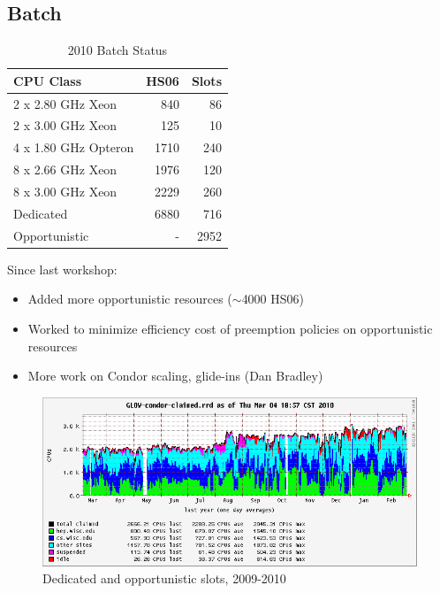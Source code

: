 \documentclass{beamer}
\newcommand{\ca}{\ensuremath{\sim}}
\begin{document}
\subsection{Batch}
\begin{frame}
\begin{table}
\begin{tabular}{lrr}
	\toprule
	CPU Class							&	 HS06		&	Slots \\
	\midrule
	2 x 2.80 GHz Xeon			&	 840		&	 86 \\	%
	2 x 3.00 GHz Xeon			&	 125		&	 10 \\	%
	4 x 1.80 GHz Opteron	&	 1710	 	&	 240 \\	%
	8 x 2.66 GHz Xeon			&	 1976	 	&	 120 \\	%
	8 x 3.00 GHz Xeon			&	 2229		&	 260 \\	%
	\midrule
	Dedicated							&	 6880		&	 716 \\
	Opportunistic					&	 -			&	 2952 \\
	\bottomrule
\end{tabular}
\caption{2010 Batch Status}
\label{2010_batch_status}
\end{table}

Since last workshop:
\begin{itemize}
	\item Added more opportunistic resources (\ca{}4000 HS06)
	\item Worked to minimize efficiency cost of preemption policies on opportunistic resources
	\item More work on Condor scaling, glide-ins (Dan Bradley)
\end{itemize}
\end{frame}

\begin{frame}
\begin{figure}
	\includegraphics[width=\textwidth]{Graphics/GLOW-condor-claimed-1yr.png}
	\caption{Dedicated and opportunistic slots, 2009-2010}
\end{figure}
\end{frame}
\end{document}
